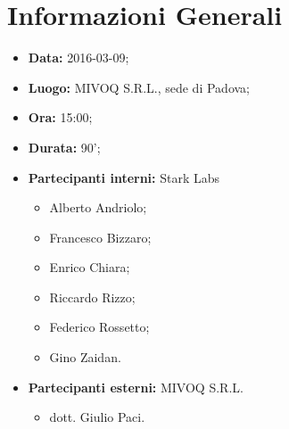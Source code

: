 \section{Informazioni Generali}

\begin{itemize}
\item \textbf{Data:} 2016-03-09;
\item \textbf{Luogo:} MIVOQ S.R.L., sede di Padova;
\item \textbf{Ora:} 15:00;
\item \textbf{Durata:} 90';
\item \textbf{Partecipanti interni:} Stark Labs
	\begin{itemize}
	\item Alberto Andriolo;
	\item Francesco Bizzaro;
	\item Enrico Chiara;
	\item Riccardo Rizzo;
	\item Federico Rossetto;
	\item Gino Zaidan.
	\end{itemize}
\item \textbf{Partecipanti esterni:} MIVOQ S.R.L.
	\begin{itemize}
	\item dott. Giulio Paci.
	\end{itemize}
\end{itemize}










